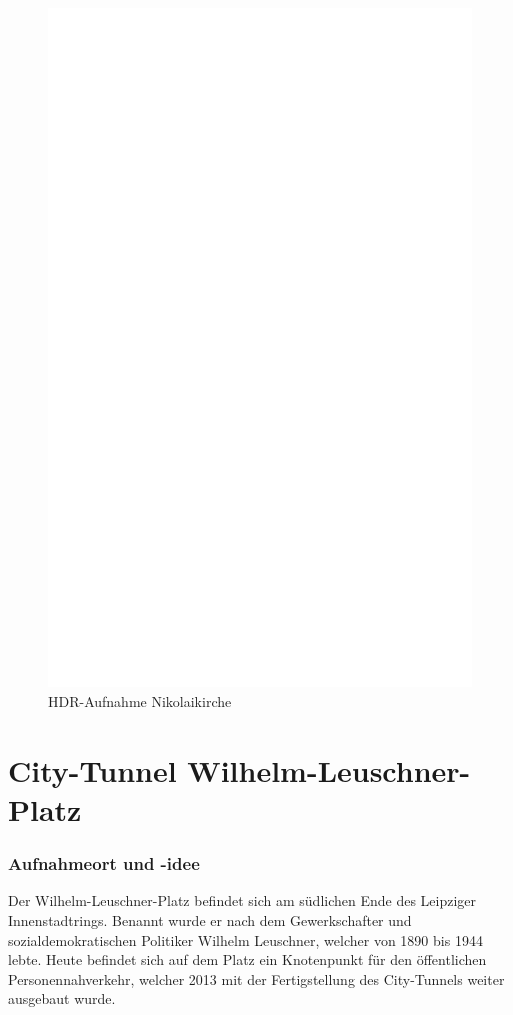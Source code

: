 \documentclass[liststotoc,bibtotoc,fontsize=14pt,]{scrreprt}
\begin{document}
\newpage
\begin{figure}[h]
	\includegraphics[width=\linewidth]{img/ph.jpg}
	\caption{HDR-Aufnahme Nikolaikirche}
\end{figure}
	
	\section{City-Tunnel Wilhelm-Leuschner-Platz }
	\label{sec:tunnel}
	\subsubsection{Aufnahmeort und -idee}
	Der Wilhelm-Leuschner-Platz befindet sich am südlichen Ende des Leipziger Innenstadtrings. Benannt wurde er nach dem Gewerkschafter und sozialdemokratischen Politiker Wilhelm Leuschner, welcher von 1890 bis 1944 lebte. Heute befindet sich auf dem Platz ein Knotenpunkt für den öffentlichen Personennahverkehr, welcher 2013 mit der Fertigstellung des City-Tunnels weiter ausgebaut wurde. 
	
\end{document}
